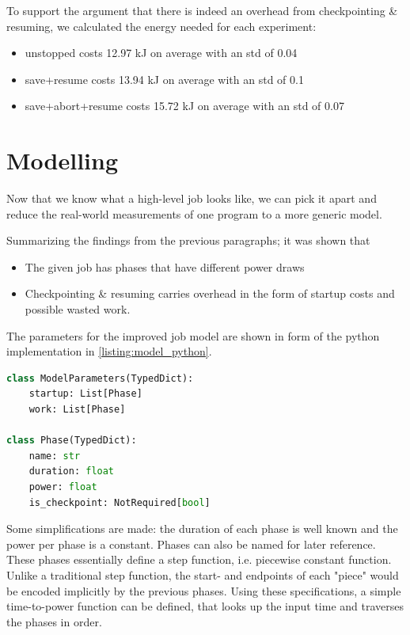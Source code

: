 To support the argument that there is indeed an overhead from checkpointing \& resuming, we calculated the energy needed for each experiment:

\begin{itemize}
    \item  unstopped costs 12.97 kJ on average with an std of 0.04
    \item  save+resume costs 13.94 kJ on average with an std of 0.1
    \item  save+abort+resume costs 15.72 kJ on average with an std of 0.07
\end{itemize}

\section{Modelling}

Now that we know what a high-level job looks like, we can pick it apart and reduce the real-world measurements of one program to a more generic model. 

Summarizing the findings from the previous paragraphs; it was shown that 

\begin{itemize}
    \item The given job has phases that have different power draws
    \item Checkpointing \& resuming carries overhead in the form of startup costs and possible wasted work.
\end{itemize}

The parameters for the improved job model are shown in form of the python implementation in \ref{listing:model_python}. 

\begin{lstlisting}[language=python, frame=single, numbers=none, caption={Python Model definition}, basicstyle=\ttfamily, label={listing:model_python}]
class ModelParameters(TypedDict):
    startup: List[Phase]
    work: List[Phase]
    
class Phase(TypedDict):
    name: str
    duration: float
    power: float
    is_checkpoint: NotRequired[bool]   
\end{lstlisting}

Some simplifications are made: the duration of each phase is well known and the power per phase is a constant. 
Phases can also be named for later reference.
These phases essentially define a step function, i.e. piecewise constant function.
Unlike a traditional step function, the start- and endpoints of each "piece" would be encoded implicitly by the previous phases.
Using these specifications, a simple time-to-power function can be defined, that looks up the input time and traverses the phases in order.

